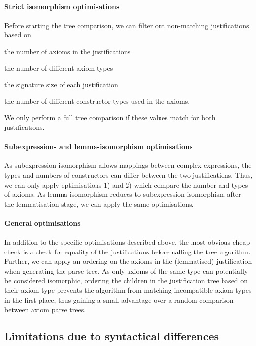 \paragraph{Strict isomorphism optimisations}
Before starting the tree comparison, we can filter out non-matching justifications based on 
\begin{compactenum}
\item the number of axioms in the justifications
\item the number of different axiom types
\item the signature size of each justification
\item the number of different constructor types used in the axioms.
\end{compactenum}
We only perform a full tree comparison if these values match for both justifications.

\paragraph{Subexpression- and lemma-isomorphism optimisations}
As subexpression-isomorphism allows mappings between complex expressions, the types and numbers of constructors can differ between the two justifications. Thus, we can only apply optimisations 1) and 2) which compare the number and types of axioms. As lemma-isomorphism reduces to subexpression-isomorphism after the lemmatisation stage, we can apply the same optimisations.

\paragraph{General optimisations}
In addition to the specific optimisations described above, the most obvious cheap check is a check for equality of the justifications before calling the tree algorithm. Further, we can apply an ordering on the axioms in the (lemmatised) justification when generating the parse tree. As only axioms of the same type can potentially be considered isomorphic, ordering the children in the justification tree based on their axiom type prevents the algorithm from matching incompatible axiom types in the first place, thus gaining a small advantage over a random comparison between axiom parse trees.

\subsection{Limitations due to syntactical differences}

